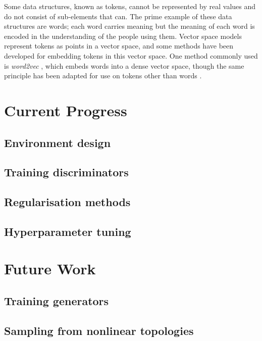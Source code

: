 \documentclass[a4paper]{article}
\begin{document}
Some data structures, known as tokens, cannot be represented by real values and do not consist of sub-elements that can.
The prime example of these data structures are words; each word carries meaning but the meaning of each word is encoded in the understanding of the people using them.
Vector space models represent tokens as points in a vector space, and some methods have been developed for embedding tokens in this vector space.
One method commonly used is \emph{word2vec} \cite{mikolov13}, which embeds words into a dense vector space, though the same principle
has been adapted for use on tokens other than words \cite{le14}.

\section{Current Progress}

\subsection{Environment design}

\subsection{Training discriminators}

\subsection{Regularisation methods}

\subsection{Hyperparameter tuning}

\section{Future Work}

\subsection{Training generators}

\subsection{Sampling from nonlinear topologies}
\end{document}

